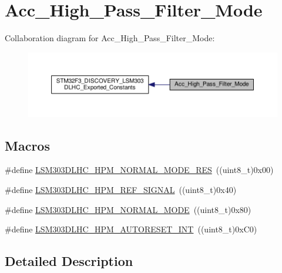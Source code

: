 \hypertarget{group__Acc__High__Pass__Filter__Mode}{\section{Acc\+\_\+\+High\+\_\+\+Pass\+\_\+\+Filter\+\_\+\+Mode}
\label{group__Acc__High__Pass__Filter__Mode}
}
Collaboration diagram for Acc\+\_\+\+High\+\_\+\+Pass\+\_\+\+Filter\+\_\+\+Mode\+:\nopagebreak
\begin{figure}[H]
\begin{center}
\leavevmode
\includegraphics[width=350pt]{group__Acc__High__Pass__Filter__Mode}
\end{center}
\end{figure}
\subsection*{Macros}
\begin{DoxyCompactItemize}
\item 
\#define \hyperlink{group__Acc__High__Pass__Filter__Mode_gae9661c5c6cf14a795f5aa7e07c250cab}{L\+S\+M303\+D\+L\+H\+C\+\_\+\+H\+P\+M\+\_\+\+N\+O\+R\+M\+A\+L\+\_\+\+M\+O\+D\+E\+\_\+\+R\+E\+S}~((uint8\+\_\+t)0x00)
\item 
\#define \hyperlink{group__Acc__High__Pass__Filter__Mode_ga575c6f264ac8cf59074e5a795fb3065d}{L\+S\+M303\+D\+L\+H\+C\+\_\+\+H\+P\+M\+\_\+\+R\+E\+F\+\_\+\+S\+I\+G\+N\+A\+L}~((uint8\+\_\+t)0x40)
\item 
\#define \hyperlink{group__Acc__High__Pass__Filter__Mode_ga4fb783e71638404800cf9351106676dd}{L\+S\+M303\+D\+L\+H\+C\+\_\+\+H\+P\+M\+\_\+\+N\+O\+R\+M\+A\+L\+\_\+\+M\+O\+D\+E}~((uint8\+\_\+t)0x80)
\item 
\#define \hyperlink{group__Acc__High__Pass__Filter__Mode_gae7490934b6923dd50e8dfb88bd2a32db}{L\+S\+M303\+D\+L\+H\+C\+\_\+\+H\+P\+M\+\_\+\+A\+U\+T\+O\+R\+E\+S\+E\+T\+\_\+\+I\+N\+T}~((uint8\+\_\+t)0x\+C0)
\end{DoxyCompactItemize}


\subsection{Detailed Description}


